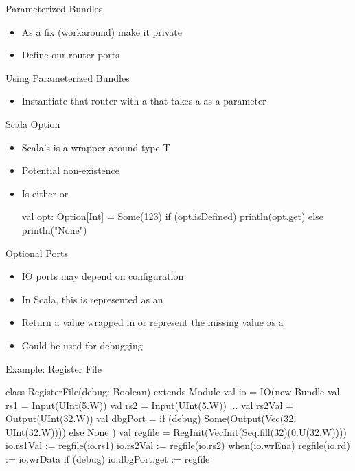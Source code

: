 \begin{frame}[fragile]{Parameterized Bundles}
\begin{itemize}
\item As a fix (workaround) make it private
\item Define our router ports
\end{itemize}
\end{frame}


\begin{frame}[fragile]{Using Parameterized Bundles}
\begin{itemize}
\item Instantiate that router with a  that takes
a  as a parameter
\end{itemize}
\end{frame}

\begin{frame}[fragile]{Scala Option}
\begin{itemize}
\item Scala's  is a wrapper around type T
\item Potential non-existence
\item Is either  or 
\begin{chisel}
val opt: Option[Int] = Some(123)
if (opt.isDefined)
  println(opt.get)
else
  println("None")
\end{chisel}
\end{itemize}
\end{frame}

\begin{frame}[fragile]{Optional Ports}
\begin{itemize}
\item IO ports may depend on configuration
\item In Scala, this is represented as an 
\item Return a value wrapped in  or represent the missing value
as a 
\item Could be used for debugging
\end{itemize}
\end{frame}

\begin{frame}[fragile]{Example: Register File}
\begin{chisel}
class RegisterFile(debug: Boolean) extends Module {
  val io = IO(new Bundle {
    val rs1 = Input(UInt(5.W))
    val rs2 = Input(UInt(5.W))
...
    val rs2Val = Output(UInt(32.W))
    val dbgPort = if (debug)
      Some(Output(Vec(32, UInt(32.W)))) else None
  })
  val regfile = RegInit(VecInit(Seq.fill(32)(0.U(32.W))))
  io.rs1Val := regfile(io.rs1)
  io.rs2Val := regfile(io.rs2)
  when(io.wrEna) {
    regfile(io.rd) := io.wrData
  }
  if (debug) {
    io.dbgPort.get := regfile
  }}
\end{chisel}
\end{frame}

